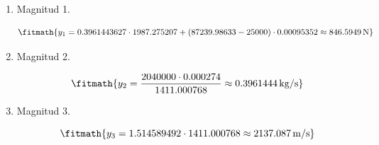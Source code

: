 \begin{enumerate}

\item Magnitud 1.

\[\fitmath{y_{1}=0.3961443627\cdot 1987.275207+\left(87239.98633-25000\right)\cdot 0.00095352\approx 846.5949\,\mathrm{N}}\]

\item Magnitud 2.

\[\fitmath{y_{2}=\frac{2040000\cdot 0.000274}{1411.000768}\approx 0.3961444\,\mathrm{kg/s}}\]

\item Magnitud 3.

\[\fitmath{y_{3}=1.514589492\cdot 1411.000768\approx 2137.087\,\mathrm{m/s}}\]

\end{enumerate}
